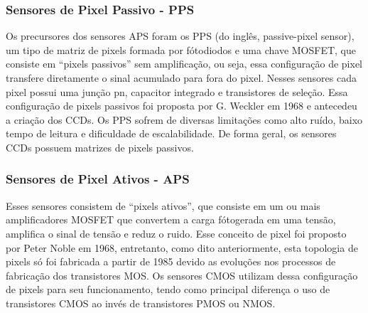 \documentclass[10pt,a4paper,twocolumn]{article}
\begin{document}
	\subsubsection*{Sensores de Pixel Passivo - PPS} 
		Os precursores dos sensores APS foram os PPS (do inglês, passive-pixel sensor), um tipo de matriz de pixels formada por fótodiodos e uma chave MOSFET, que consiste em ``pixels passivos'' sem amplificação, ou seja, essa configuração de pixel transfere diretamente o sinal acumulado para fora do pixel. Nesses sensores cada pixel possui uma junção pn, capacitor integrado e transistores de seleção. Essa configuração de pixels passivos foi proposta por G. Weckler em 1968 e antecedeu a criação dos CCDs. Os PPS sofrem de diversas limitações como alto ruído, baixo tempo de leitura e dificuldade de escalabilidade. De forma geral, os sensores CCDs possuem matrizes de pixels passivos.
		
	\subsubsection*{Sensores de Pixel Ativos - APS}
		Esses sensores consistem de ``pixels ativos'', que consiste em um ou mais amplificadores MOSFET que convertem a carga fótogerada em uma tensão, amplifica o sinal de tensão e reduz o ruido. Esse conceito de pixel foi proposto por Peter Noble em 1968, entretanto, como dito anteriormente, esta topologia de pixels só foi fabricada a partir de 1985 devido as evoluções nos processos de fabricação dos transistores MOS.  Os sensores CMOS utilizam dessa configuração de pixels para seu funcionamento, tendo como principal diferença o uso de transistores CMOS ao invés de transistores PMOS ou NMOS.
	
\end{document}
